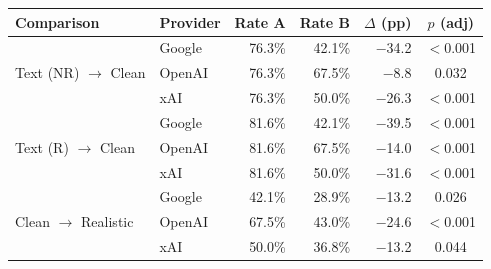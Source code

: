 \begin{tabular}{llrrrc}
\toprule
\textbf{Comparison} & \textbf{Provider} & \textbf{Rate A} & \textbf{Rate B} & \textbf{$\Delta$ (pp)} & \textbf{$p$ (adj)} \\
\midrule
\multirow{3}{*}{Text (NR) $\to$ Clean} & Google & 76.3\% & 42.1\% & $-$34.2 & $<$0.001 \\
 & OpenAI & 76.3\% & 67.5\% & $-$8.8 & 0.032 \\
 & xAI & 76.3\% & 50.0\% & $-$26.3 & $<$0.001 \\
\midrule
\multirow{3}{*}{Text (R) $\to$ Clean} & Google & 81.6\% & 42.1\% & $-$39.5 & $<$0.001 \\
 & OpenAI & 81.6\% & 67.5\% & $-$14.0 & $<$0.001 \\
 & xAI & 81.6\% & 50.0\% & $-$31.6 & $<$0.001 \\
\midrule
\multirow{3}{*}{Clean $\to$ Realistic} & Google & 42.1\% & 28.9\% & $-$13.2 & 0.026 \\
 & OpenAI & 67.5\% & 43.0\% & $-$24.6 & $<$0.001 \\
 & xAI & 50.0\% & 36.8\% & $-$13.2 & 0.044 \\
\bottomrule
\end{tabular}

